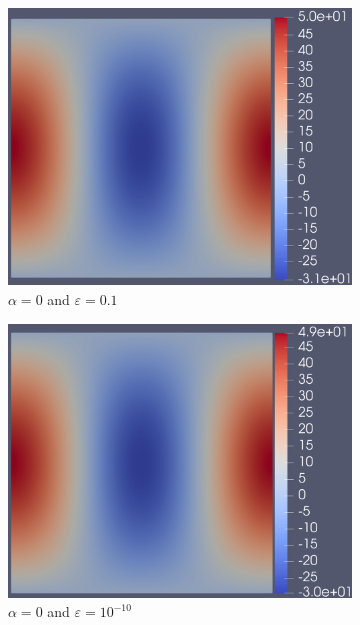 \documentclass[12pt]{ociamthesis}
\begin{document}
\begin{figure}[H]
 \begin{subfigure}{0.5\textwidth}
     \includegraphics[width=\textwidth]{Pics/uf/F_E1a_eps1.png}
     \caption{$\alpha=0$ and $\varepsilon = 0.1$}
 \end{subfigure}
   \begin{subfigure}{0.5\textwidth}
     \includegraphics[width=\textwidth]{Pics/uf/F_E1a_eps10.png}
     \caption{$\alpha=0$ and $\varepsilon = 10^{-10}$}
 \end{subfigure}
 \begin{subfigure}{0.5\textwidth}

\end{subfigure}
\end{figure}
\end{document}
